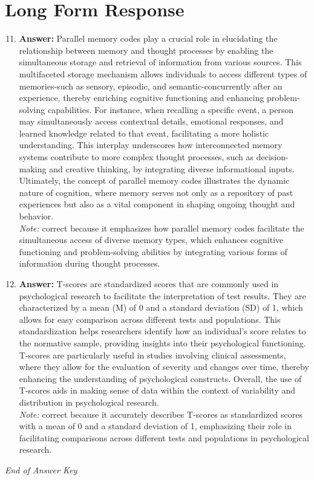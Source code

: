 \documentclass[12pt]{article}
\begin{document}
\section*{Long Form Response}
\begin{enumerate}[label=\arabic*.]
\setcounter{enumi}{10}
\item \textbf{Answer:} Parallel memory codes play a crucial role in elucidating the relationship between memory and thought processes by enabling the simultaneous storage and retrieval of information from various sources. This multifaceted storage mechanism allows individuals to access different types of memories-such as sensory, episodic, and semantic-concurrently after an experience, thereby enriching cognitive functioning and enhancing problem-solving capabilities. For instance, when recalling a specific event, a person may simultaneously access contextual details, emotional responses, and learned knowledge related to that event, facilitating a more holistic understanding. This interplay underscores how interconnected memory systems contribute to more complex thought processes, such as decision-making and creative thinking, by integrating diverse informational inputs. Ultimately, the concept of parallel memory codes illustrates the dynamic nature of cognition, where memory serves not only as a repository of past experiences but also as a vital component in shaping ongoing thought and behavior.
\\ \textit{Note:} correct because it emphasizes how parallel memory codes facilitate the simultaneous access of diverse memory types, which enhances cognitive functioning and problem-solving abilities by integrating various forms of information during thought processes.
\item \textbf{Answer:} T-scores are standardized scores that are commonly used in psychological research to facilitate the interpretation of test results. They are characterized by a mean (M) of 0 and a standard deviation (SD) of 1, which allows for easy comparison across different tests and populations. This standardization helps researchers identify how an individual's score relates to the normative sample, providing insights into their psychological functioning. T-scores are particularly useful in studies involving clinical assessments, where they allow for the evaluation of severity and changes over time, thereby enhancing the understanding of psychological constructs. Overall, the use of T-scores aids in making sense of data within the context of variability and distribution in psychological research.
\\ \textit{Note:} correct because it accurately describes T-scores as standardized scores with a mean of 0 and a standard deviation of 1, emphasizing their role in facilitating comparisons across different tests and populations in psychological research.
\end{enumerate}

\vfill
\noindent\textit{End of Answer Key}
\end{document}
